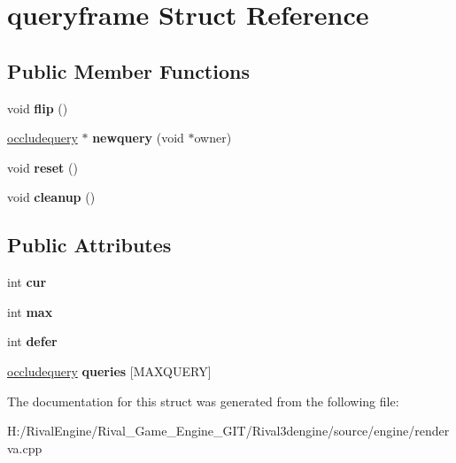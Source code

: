 \hypertarget{structqueryframe}{}\section{queryframe Struct Reference}
\label{structqueryframe}
\subsection*{Public Member Functions}
\begin{DoxyCompactItemize}
\item 
\mbox{\label{structqueryframe_a9701a6b8eae6ac83da94e7620275a1d4}} 
void {\bfseries flip} ()
\item 
\mbox{\label{structqueryframe_ac98d0abb5fcf3c1ef4ad6fce7257c309}} 
\hyperlink{structoccludequery}{occludequery} $\ast$ {\bfseries newquery} (void $\ast$owner)
\item 
\mbox{\label{structqueryframe_af3f37aac5ba966b7ea3df57dbbf682a9}} 
void {\bfseries reset} ()
\item 
\mbox{\label{structqueryframe_a2ba5dc0d1dadb8b322d08decbcda4fc6}} 
void {\bfseries cleanup} ()
\end{DoxyCompactItemize}
\subsection*{Public Attributes}
\begin{DoxyCompactItemize}
\item 
\mbox{\label{structqueryframe_a57f6618d58301ac48082c36c831e17db}} 
int {\bfseries cur}
\item 
\mbox{\label{structqueryframe_a1c1d088e6f1014a1ee074ea56a84790f}} 
int {\bfseries max}
\item 
\mbox{\label{structqueryframe_aa4ffcc1328fe28bee00b40c55149739c}} 
int {\bfseries defer}
\item 
\mbox{\label{structqueryframe_a6c5891624e33bee0fd7e3be20c3815a3}} 
\hyperlink{structoccludequery}{occludequery} {\bfseries queries} \mbox{[}M\+A\+X\+Q\+U\+E\+RY\mbox{]}
\end{DoxyCompactItemize}


The documentation for this struct was generated from the following file\+:\begin{DoxyCompactItemize}
\item 
H\+:/\+Rival\+Engine/\+Rival\+\_\+\+Game\+\_\+\+Engine\+\_\+\+G\+I\+T/\+Rival3dengine/source/engine/renderva.\+cpp\end{DoxyCompactItemize}
